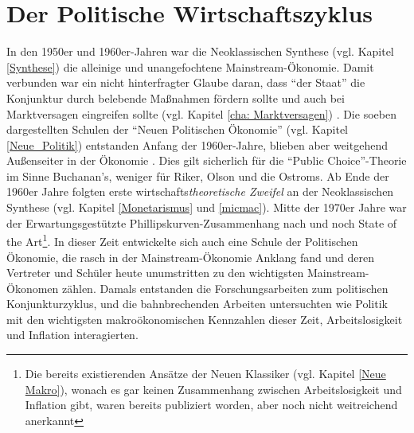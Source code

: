 \section{Der Politische Wirtschaftszyklus}
\label{Der Politische Wirtschaftszyklus}

In den 1950er und 1960er-Jahren war die Neoklassischen Synthese (vgl. Kapitel \ref{Synthese}) die alleinige und unangefochtene Mainstream-Ökonomie. Damit verbunden war ein nicht hinterfragter Glaube daran, dass "`der Staat"' die Konjunktur durch belebende Maßnahmen fördern sollte und auch bei Marktversagen eingreifen sollte (vgl. Kapitel \ref{cha: Marktversagen}) \parencite[S. 522]{Snowdon2005}. Die soeben dargestellten Schulen der "`Neuen Politischen Ökonomie"' (vgl. Kapitel \ref{Neue_Politik}) entstanden Anfang der 1960er-Jahre, blieben aber weitgehend Außenseiter in der Ökonomie \parencite[S. 113]{Mitchell1988}. Dies gilt sicherlich für die "`Public Choice"'-Theorie im Sinne Buchanan's, weniger für Riker, Olson und die Ostroms. Ab Ende der 1960er Jahre folgten erste wirtschafts\textit{theoretische Zweifel} an der Neoklassischen Synthese (vgl. Kapitel \ref{Monetarismus} und \ref{micmac}). Mitte der 1970er Jahre war der Erwartungsgestützte Phillipskurven-Zusammenhang nach \textcite{Phelps1968} und \textcite{Friedman1968} noch State of the Art\footnote{Die bereits existierenden Ansätze der Neuen Klassiker (vgl. Kapitel \ref{Neue Makro}), wonach es gar keinen Zusammenhang zwischen Arbeitslosigkeit und Inflation gibt, waren bereits publiziert worden, aber noch nicht weitreichend anerkannt}. In dieser Zeit entwickelte sich auch eine Schule der Politischen Ökonomie, die rasch in der Mainstream-Ökonomie Anklang fand und deren Vertreter und Schüler heute unumstritten zu den wichtigsten Mainstream-Ökonomen zählen. Damals entstanden die Forschungsarbeiten zum politischen Konjunkturzyklus, und die bahnbrechenden Arbeiten untersuchten wie Politik mit den wichtigsten makroökonomischen Kennzahlen dieser Zeit, Arbeitslosigkeit und Inflation interagierten.
